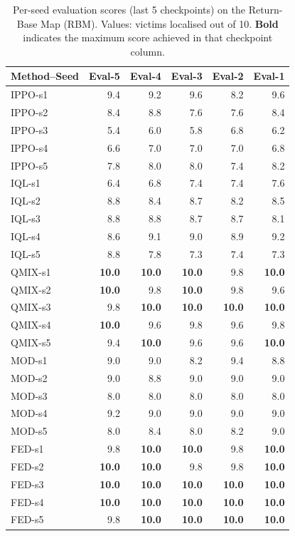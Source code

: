 \begin{table}[t]
\centering
\caption{Per-seed evaluation scores (last 5 checkpoints) on the Return-Base Map (RBM). Values: victims localised out of 10. \textbf{Bold} indicates the maximum score achieved in that checkpoint column.}
\label{tab:seed_rbm}
\small
\begin{tabular}{lrrrrr}
\toprule
Method--Seed & Eval-5 & Eval-4 & Eval-3 & Eval-2 & Eval-1 \\
\midrule
IPPO-s1 & 9.4 & 9.2 & 9.6 & 8.2 & 9.6 \\
IPPO-s2 & 8.4 & 8.8 & 7.6 & 7.6 & 8.4 \\
IPPO-s3 & 5.4 & 6.0 & 5.8 & 6.8 & 6.2 \\
IPPO-s4 & 6.6 & 7.0 & 7.0 & 7.0 & 6.8 \\
IPPO-s5 & 7.8 & 8.0 & 8.0 & 7.4 & 8.2 \\
\midrule
IQL-s1 & 6.4 & 6.8 & 7.4 & 7.4 & 7.6 \\
IQL-s2 & 8.8 & 8.4 & 8.7 & 8.2 & 8.5 \\
IQL-s3 & 8.8 & 8.8 & 8.7 & 8.7 & 8.1 \\
IQL-s4 & 8.6 & 9.1 & 9.0 & 8.9 & 9.2 \\
IQL-s5 & 8.8 & 7.8 & 7.3 & 7.4 & 7.3 \\
\midrule
QMIX-s1 & \textbf{10.0} & \textbf{10.0} & \textbf{10.0} & 9.8 & \textbf{10.0} \\
QMIX-s2 & \textbf{10.0} & 9.8 & \textbf{10.0} & 9.8 & 9.6 \\
QMIX-s3 & 9.8 & \textbf{10.0} & \textbf{10.0} & \textbf{10.0} & \textbf{10.0} \\
QMIX-s4 & \textbf{10.0} & 9.6 & 9.8 & 9.6 & 9.8 \\
QMIX-s5 & 9.4 & \textbf{10.0} & 9.6 & 9.6 & \textbf{10.0} \\
\midrule
MOD-s1 & 9.0 & 9.0 & 8.2 & 9.4 & 8.8 \\
MOD-s2 & 9.0 & 8.8 & 9.0 & 9.0 & 9.0 \\
MOD-s3 & 8.0 & 8.0 & 8.0 & 8.0 & 8.0 \\
MOD-s4 & 9.2 & 9.0 & 9.0 & 9.0 & 9.0 \\
MOD-s5 & 8.0 & 8.4 & 8.0 & 8.2 & 9.0 \\
\midrule
FED-s1 & 9.8 & \textbf{10.0} & \textbf{10.0} & 9.8 & \textbf{10.0} \\
FED-s2 & \textbf{10.0} & \textbf{10.0} & 9.8 & 9.8 & \textbf{10.0} \\
FED-s3 & \textbf{10.0} & \textbf{10.0} & \textbf{10.0} & \textbf{10.0} & \textbf{10.0} \\
FED-s4 & \textbf{10.0} & \textbf{10.0} & \textbf{10.0} & \textbf{10.0} & \textbf{10.0} \\
FED-s5 & 9.8 & \textbf{10.0} & \textbf{10.0} & \textbf{10.0} & \textbf{10.0} \\
\bottomrule
\end{tabular}
\end{table}
